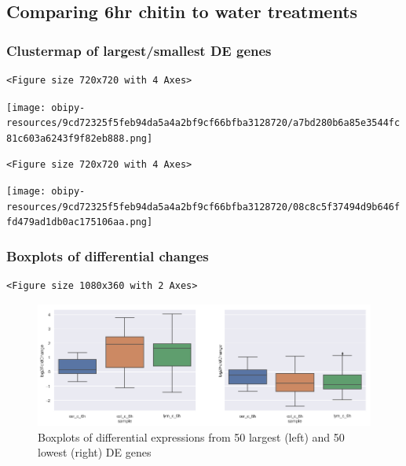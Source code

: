 \documentclass[a4paper]{article}
\begin{document}
\clearpage

\subsection{Comparing 6hr chitin to water treatments}
\label{sec:org6ab7a03}

\subsubsection{Clustermap of largest/smallest DE genes}
\label{sec:org349ce79}
\begin{verbatim}
<Figure size 720x720 with 4 Axes>
\end{verbatim}

\begin{center}
\texttt{[image: obipy-resources/9cd72325f5feb94da5a4a2bf9cf66bfba3128720/a7bd280b6a85e3544fc81c603a6243f9f82eb888.png]}
\end{center}

\begin{verbatim}
<Figure size 720x720 with 4 Axes>
\end{verbatim}

\begin{center}
\texttt{[image: obipy-resources/9cd72325f5feb94da5a4a2bf9cf66bfba3128720/08c8c5f37494d9b646ffd479ad1db0ac175106aa.png]}
\end{center}

\subsubsection{Boxplots of differential changes}
\label{sec:org20253f0}

\begin{verbatim}
<Figure size 1080x360 with 2 Axes>
\end{verbatim}

\begin{figure}[htbp]
\centering
\includegraphics[width=.9\linewidth]{obipy-resources/pairings_6hr_boxplots.png}
\caption{\label{pairings_6hr_boxplots}
Boxplots of differential expressions from 50 largest (left) and 50 lowest (right) DE genes}
\end{figure}
\end{document}
